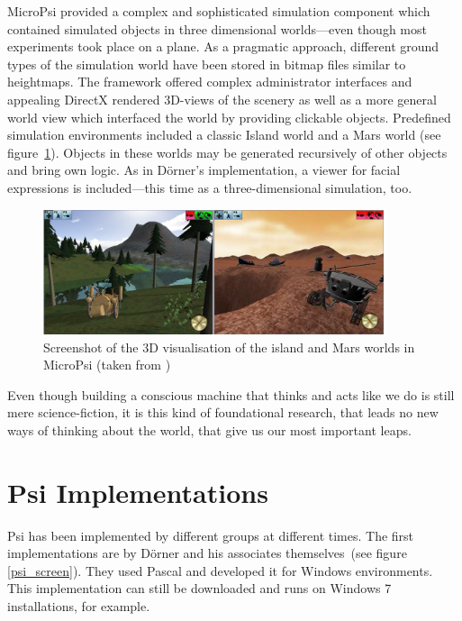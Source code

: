 MicroPsi provided a complex and sophisticated simulation component which contained simulated objects in three dimensional worlds---even though most experiments took place on a plane. As a pragmatic approach, different ground types of the simulation world have been stored in bitmap files similar to heightmaps. The framework offered complex administrator interfaces and appealing DirectX rendered 3D-views of the scenery as well as a more general world view which interfaced the world by providing clickable objects. Predefined simulation environments included a classic Island world and a Mars world (see figure~\ref{micropsi_3d_screen}). Objects in these worlds may be generated recursively of other objects and bring own logic. As in Dörner's implementation, a viewer for facial expressions is included---this time as a three-dimensional simulation, too.~\cite{Bach:2009:PSI:1611304}


\begin{figure}[h]
  \centering
    \includegraphics[width=10cm]{graphics/micropsi_3d_screen}
  \caption{Screenshot of the 3D visualisation of the island and Mars worlds in MicroPsi (taken from \cite{Bach:2009:PSI:1611304})}
  \label{micropsi_3d_screen}
\end{figure}


Even though building a conscious machine that thinks and acts like we do is still mere science-fiction, it is this kind of foundational research, that leads no new ways of thinking about the world, that give us our most important leaps.


    \section{Psi Implementations}
Psi has been implemented by different groups at different times. The first implementations are by Dörner and his associates themselves~(see figure \ref{psi_screen}). They used Pascal and developed it for Windows environments. This implementation can still be downloaded and runs on Windows 7 installations, for example.


